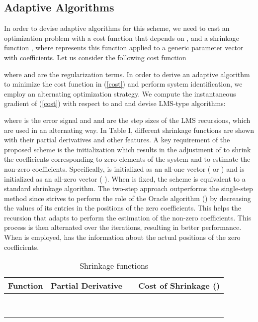 \documentclass[10pt,onecolumn]{IEEEtran}
\begin{document}
\subsection{Adaptive Algorithms}

In order to devise adaptive algorithms for this scheme, we need to
cast an optimization problem with a cost function that depends on
,  and a shrinkage function
,  where  represents this function
applied to a generic parameter vector  with 
coefficients. Let us consider the following cost function

where  and  are the regularization terms. In order to
derive an adaptive algorithm to minimize the cost function in
(\ref{cost}) and perform system identification, we employ an
alternating optimization strategy. We compute the instantaneous
gradient of (\ref{cost}) with respect to  and
 and devise LMS-type algorithms:
\vspace{-0.25em}

\vspace{-0.75em}

where  is the
error signal and  and  are the step sizes of the LMS
recursions, which are used in an alternating way. In Table I,
different shrinkage functions are shown with their partial
derivatives and other features. {A key requirement of the proposed
scheme is the initialization which results in the adjustment of
 to shrink the coefficients corresponding to
zero elements of the system and  to estimate the
non-zero coefficients. Specifically,  is
initialized as an all-one vector ( or ) and  is initialized as an all-zero vector ( ). When  is fixed, the scheme
is equivalent to a standard shrinkage algorithm. The two-step
approach outperforms the single-step method since 
strives to perform the role of the Oracle algorithm () by decreasing the values of its entries in the positions of
the zero coefficients. This helps the recursion that adapts  to perform the estimation of the non-zero coefficients. This
process is then alternated over the iterations, resulting in better
performance. When  is employed,  has
the information about the actual positions of the zero coefficients.
}




\begin{table*}
\centering \vspace{-0.5em} \caption{Shrinkage functions}
\vspace{-1.25em} \footnotesize
\begin{tabular}{llll}
\hline  Function & Partial Derivative  &  & Cost of Shrinkage ()\\
\hline
  &  &  & 
 \\ \\
 &  &   & \\ \\
 &  &  &  \\
    & &    &
\\
    & &    &
\\
    & &    &

\\
\hline
\end{tabular}
\label{table1}
\end{table*}
\end{document}
